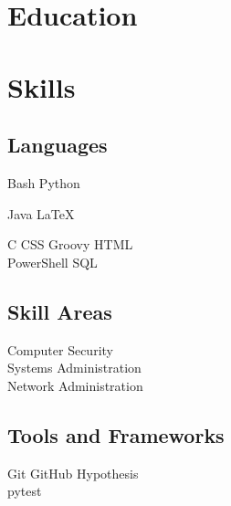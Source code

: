 \documentclass[]{deedy-resume-openfont}
\begin{document}
%
%

%
%

\begin{minipage}[t]{0.35\textwidth}


\section{Education} 
\sectionsep


\section{Skills}

\subsection{Languages}

Bash \textbullet{} Python

Java \textbullet{} \LaTeX\

C \textbullet{} CSS \textbullet{} Groovy \textbullet{} HTML \\
PowerShell \textbullet{} SQL
\sectionsep

\subsection{Skill Areas}

Computer Security \\
Systems Administration \\
Network Administration
\sectionsep

\subsection{Tools and Frameworks}
Git \textbullet{} GitHub \textbullet{} Hypothesis \\
pytest


\end{minipage}
\end{document}
